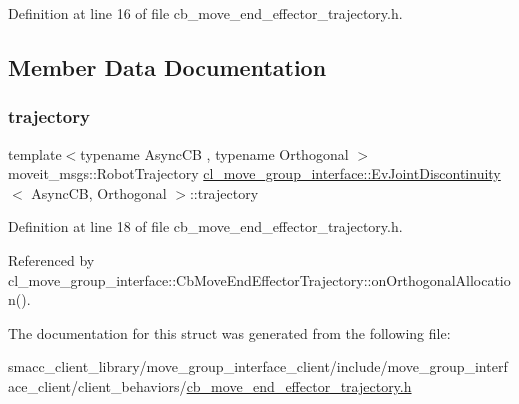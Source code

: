 Definition at line 16 of file cb\+\_\+move\+\_\+end\+\_\+effector\+\_\+trajectory.\+h.



\subsection{Member Data Documentation}
\mbox{\label{structcl__move__group__interface_1_1EvJointDiscontinuity_a6ccc8c9247d286b2c7dae1746357831b}} 
\subsubsection{\texorpdfstring{trajectory}{trajectory}}
{\footnotesize\ttfamily template$<$typename Async\+CB , typename Orthogonal $>$ \\
moveit\+\_\+msgs\+::\+Robot\+Trajectory \hyperlink{structcl__move__group__interface_1_1EvJointDiscontinuity}{cl\+\_\+move\+\_\+group\+\_\+interface\+::\+Ev\+Joint\+Discontinuity}$<$ Async\+CB, Orthogonal $>$\+::trajectory}



Definition at line 18 of file cb\+\_\+move\+\_\+end\+\_\+effector\+\_\+trajectory.\+h.



Referenced by cl\+\_\+move\+\_\+group\+\_\+interface\+::\+Cb\+Move\+End\+Effector\+Trajectory\+::on\+Orthogonal\+Allocation().



The documentation for this struct was generated from the following file\+:\begin{DoxyCompactItemize}
\item 
smacc\+\_\+client\+\_\+library/move\+\_\+group\+\_\+interface\+\_\+client/include/move\+\_\+group\+\_\+interface\+\_\+client/client\+\_\+behaviors/\hyperlink{cb__move__end__effector__trajectory_8h}{cb\+\_\+move\+\_\+end\+\_\+effector\+\_\+trajectory.\+h}\end{DoxyCompactItemize}
